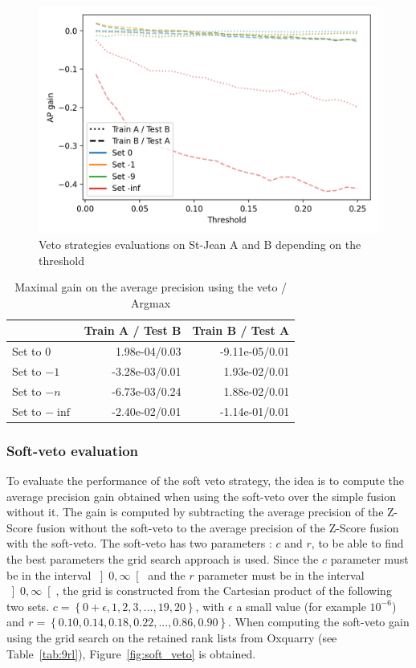 \begin{figure}
  \caption{Veto strategies evaluations on St-Jean A and B depending on the threshold}
  \label{fig:veto}
  \includegraphics[width=\linewidth]{img/veto.png}
\end{figure}

\begin{table}
  \centering
  \caption{Maximal gain on the average precision using the veto / Argmax}
  \label{tab:veto}
  \begin{tabular}{l r r}
    \toprule
                   & Train A / Test B & Train B / Test A \\
    \midrule
    Set to $0$     & 1.98e-04/0.03 & -9.11e-05/0.01 \\
    Set to $-1$    & -3.28e-03/0.01 & 1.93e-02/0.01 \\
    Set to $-n$    & -6.73e-03/0.24 & 1.88e-02/0.01 \\
    Set to $-\inf$ & -2.40e-02/0.01 & -1.14e-01/0.01 \\
    \bottomrule
  \end{tabular}
\end{table}

\subsubsection{Soft-veto evaluation}

To evaluate the performance of the soft veto strategy, the idea is to compute the average precision gain obtained when using the soft-veto over the simple fusion without it.
The gain is computed by subtracting the average precision of the Z-Score fusion without the soft-veto to the average precision of the Z-Score fusion with the soft-veto.
The soft-veto has two parameters : $c$ and $r$, to be able to find the best parameters the grid search approach is used.
Since the $c$ parameter must be in the interval $\left]0, \infty\right[$ and the $r$ parameter must be in the interval $\left]0, \infty\right[$, the grid is constructed from the Cartesian product of the following two sets.
$c = \left\{0 + \epsilon, 1, 2, 3, ..., 19, 20\right\}$, with $\epsilon$ a small value (for example $10^{-6}$) and $r = \left\{0.10, 0.14, 0.18, 0.22, ..., 0.86, 0.90\right\}$.
When computing the soft-veto gain using the grid search on the retained rank lists from Oxquarry (see Table~\ref{tab:9rl}), Figure~\ref{fig:soft_veto} is obtained.

